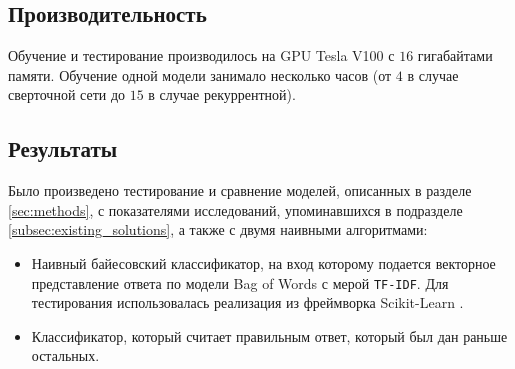 \documentclass[../diploma.tex]{subfiles}
\begin{document}
	\subsection{Производительность}

	Обучение и тестирование производилось на GPU Tesla V100 с $16$ гигабайтами памяти.
	Обучение одной модели занимало несколько часов (от $4$ в случае сверточной сети до $15$ в случае рекуррентной).

	\subsection{Результаты}
		
	Было произведено тестирование и сравнение моделей, описанных в разделе \ref{sec:methods}, 
	с показателями исследований, упоминавшихся в подразделе \ref{subsec:existing_solutions},
	а также с двумя наивными алгоритмами:

	\begin{itemize}
	
		\item
		Наивный байесовский классификатор, на вход которому подается векторное представление ответа по модели Bag of Words с мерой \texttt{TF-IDF}.
		Для тестирования использовалась реализация из фреймворка Scikit-Learn \cite{online:scikit_learn}.

	    \item
	    Классификатор, который считает правильным ответ, который был дан раньше остальных.

	\end{itemize}
\end{document}
